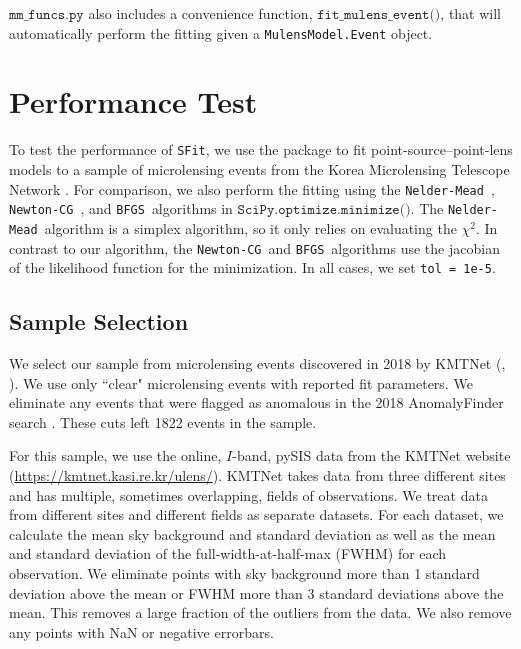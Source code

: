 \documentclass[preprint]{aastex631}
\newcommand{\HL}[1]{\textcolor{red}{\bf#1}}
\newcommand{\minimize}{$\texttt{SciPy.optimize.minimize()}$}
\newcommand{\neldermead}{\texttt{Nelder-Mead}}
\newcommand{\newtoncg}{\texttt{Newton-CG}}
\newcommand{\bfgs}{\texttt{BFGS}}
\newcommand{\sfit}{\texttt{SFit}}
\begin{document}
$\texttt{mm\_funcs.py}$ also includes a convenience function, $\texttt{fit\_mulens\_event()}$, that will automatically perform the fitting given a  \texttt{MulensModel.Event} object.
 
\section{Performance Test}

To test the performance of \sfit, we use the package to fit point-source--point-lens models \citep{Paczynski86b} to a sample of microlensing events from the Korea Microlensing Telescope Network \citep[KMTNet;][]{Kim16_KMTNet}. For comparison, we also perform the fitting using the \neldermead\, \citep{NelderMead}, \newtoncg\, \citep{QuasiNewtonMethods}, and \bfgs\, \citep{QuasiNewtonMethods} algorithms in \minimize. The \neldermead\, algorithm is a simplex algorithm, so it only relies on evaluating the $\chi^2$. In contrast to our algorithm, the \newtoncg\, and \bfgs\, algorithms use the jacobian of the likelihood function for the minimization. In all cases, we set \texttt{tol = 1e-5}.

\subsection{Sample Selection}

We select  our sample from microlensing events discovered in 2018 by KMTNet (\citealt{KimKim18_EF}, \citealt{Kim18EF,Kim18_AF}). We use only ``clear" microlensing events with reported fit parameters. We eliminate any events that were flagged as anomalous in the 2018 AnomalyFinder search \citep[although possible \HL{finite source [did I remove that one FS one?]} or ``buried" host events were left in the sample;][]{Gould22AF5,Jung22AF6}. These cuts left 1822 events in the sample. 

For this sample, we use the online, $I$-band, pySIS \citep{Albrow09} data  from the KMTNet website (\url{https://kmtnet.kasi.re.kr/ulens/}). KMTNet takes data from three different sites and has multiple, sometimes overlapping, fields of observations. We treat data from different sites and different fields as separate datasets. For each dataset, we calculate the mean sky background and standard deviation as well as the mean and standard deviation of the full-width-at-half-max (FWHM) for each observation. We eliminate points with sky background more than 1 standard deviation above the mean or FWHM more than 3 standard deviations above the mean. This removes a large fraction of the outliers from the data. We also remove any points with NaN or negative errorbars.
\end{document}

